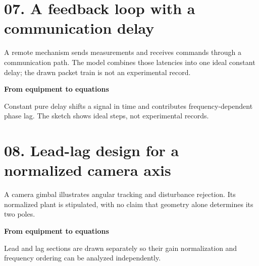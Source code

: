 \documentclass[10pt,a4paper]{article}
\begin{document}
\section*{07. A feedback loop with a communication delay}
\begin{center}\resizebox{.88\linewidth}{!}{}\par{\small A remote mechanism sends measurements and receives commands through a communication path. The model combines those latencies into one ideal constant delay; the drawn packet train is not an experimental record.}\end{center}
\medskip\textbf{From equipment to equations}\par
\begin{center}\resizebox{\ifdim\width>.98\linewidth.98\linewidth\else\width\fi}{!}{}\par{\small Constant pure delay shifts a signal in time and contributes frequency-dependent phase lag. The sketch shows ideal steps, not experimental records.}\end{center}

\newpage
\section*{08. Lead-lag design for a normalized camera axis}
\begin{center}\resizebox{.88\linewidth}{!}{}\par{\small A camera gimbal illustrates angular tracking and disturbance rejection. Its normalized plant is stipulated, with no claim that geometry alone determines its two poles.}\end{center}
\medskip\textbf{From equipment to equations}\par
\begin{center}\resizebox{\ifdim\width>.98\linewidth.98\linewidth\else\width\fi}{!}{}\par{\small Lead and lag sections are drawn separately so their gain normalization and frequency ordering can be analyzed independently.}\end{center}

\newpage
\end{document}
